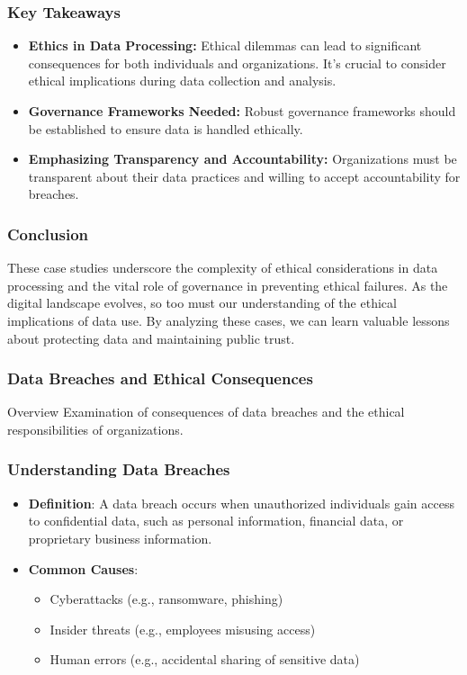 \documentclass[aspectratio=169]{beamer}
\begin{document}
\begin{frame}[fragile]
    \frametitle{Key Takeaways}
    \begin{itemize}
        \item \textbf{Ethics in Data Processing:} Ethical dilemmas can lead to significant consequences for both individuals and organizations. It's crucial to consider ethical implications during data collection and analysis.
        \item \textbf{Governance Frameworks Needed:} Robust governance frameworks should be established to ensure data is handled ethically.
        \item \textbf{Emphasizing Transparency and Accountability:} Organizations must be transparent about their data practices and willing to accept accountability for breaches.
    \end{itemize}
\end{frame}

\begin{frame}[fragile]
    \frametitle{Conclusion}
    These case studies underscore the complexity of ethical considerations in data processing and the vital role of governance in preventing ethical failures. As the digital landscape evolves, so too must our understanding of the ethical implications of data use. By analyzing these cases, we can learn valuable lessons about protecting data and maintaining public trust.
\end{frame}

\begin{frame}[fragile]
    \frametitle{Data Breaches and Ethical Consequences}
    \begin{block}{Overview}
        Examination of consequences of data breaches and the ethical responsibilities of organizations.
    \end{block}
\end{frame}

\begin{frame}[fragile]
    \frametitle{Understanding Data Breaches}
    \begin{itemize}
        \item \textbf{Definition}: A data breach occurs when unauthorized individuals gain access to confidential data, such as personal information, financial data, or proprietary business information.
        
        \item \textbf{Common Causes}:
        \begin{itemize}
            \item Cyberattacks (e.g., ransomware, phishing)
            \item Insider threats (e.g., employees misusing access)
            \item Human errors (e.g., accidental sharing of sensitive data)
        \end{itemize}
    \end{itemize}
\end{frame}
\end{document}
